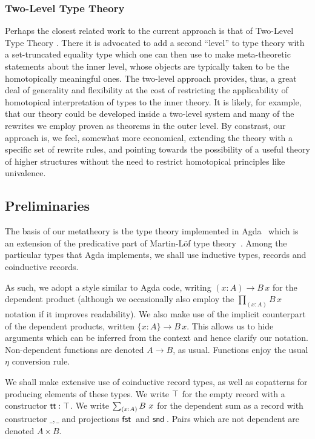 \subsubsection{Two-Level Type Theory}

Perhaps the closest related work to the current approach is that of
Two-Level Type Theory \cite{DBLP:journals/corr/AnnenkovCK17}.  There
it is advocated to add a second ``level'' to type theory with a
set-truncated equality type which one can then use to make
meta-theoretic statements about the inner level, whose objects are
typically taken to be the homotopically meaningful ones.  The
two-level approach provides, thus, a great deal of generality and
flexibility at the cost of restricting the applicability of
homotopical interpretation of types to the inner theory.  It is
likely, for example, that our theory could be developed inside a
two-level system and many of the rewrites we employ proven as theorems
in the outer level.  By constrast, our approach is, we feel, somewhat
more economical, extending the theory with a specific set of rewrite
rules, and pointing towards the possibility of a useful theory of
higher structures without the need to restrict homotopical principles
like univalence.

\subsection{Preliminaries}

The basis of our metatheory is the type theory implemented in
Agda~\cite{agda} which is an extension of the predicative part of
Martin-Löf type theory~\cite{ML75}. Among the particular types that
Agda implements, we shall use inductive types, records and coinductive
records.

As such, we adopt a style similar to Agda code, writing
$(x : A) \to B\, x$ for the dependent product (although we
occasionally also employ the $\prod_{(x : A)} B\, x$ notation if it
improves readability).  We also make use of the implicit counterpart
of the dependent products, written $\{x : A\} \to B\, x$.  This allows
us to hide arguments which can be inferred from the context and hence
clarify our notation.  Non-dependent functions are denoted $A \to B$,
as usual. Functions enjoy the usual $\eta$ conversion rule.

We shall make extensive use of coinductive record types, as well as
copatterns for producing elements of these types.  We write $\top$
for the empty record with a constructor $\mathsf{tt} : \top$. We write
$\textstyle{\sum_{(x : A)}}\, B\ x$ for the dependent sum as a record with constructor
$\_, \_$ and projections $\mathsf{fst}\,$ and $\mathsf{snd}\,$. Pairs which are not
dependent are denoted $A \times B$.

